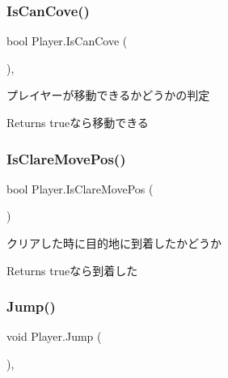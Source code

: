 \subsubsection{\texorpdfstring{Is\+Can\+Cove()}{IsCanCove()}}
{\footnotesize\ttfamily bool Player.\+Is\+Can\+Cove (\begin{DoxyParamCaption}{ }\end{DoxyParamCaption})\hspace{0.3cm}{\ttfamily [inline]}, {\ttfamily [private]}}



プレイヤーが移動できるかどうかの判定 

\begin{DoxyReturn}{Returns}
trueなら移動できる
\end{DoxyReturn}
\mbox{\label{class_player_a2aacc7413713cf79b529a0a9965ea3d8}} 
\subsubsection{\texorpdfstring{Is\+Clare\+Move\+Pos()}{IsClareMovePos()}}
{\footnotesize\ttfamily bool Player.\+Is\+Clare\+Move\+Pos (\begin{DoxyParamCaption}{ }\end{DoxyParamCaption})\hspace{0.3cm}{\ttfamily [inline]}}



クリアした時に目的地に到着したかどうか 

\begin{DoxyReturn}{Returns}
trueなら到着した
\end{DoxyReturn}
\mbox{\label{class_player_a689d6b007b09f694a246fe806bef7d5f}} 
\subsubsection{\texorpdfstring{Jump()}{Jump()}}
{\footnotesize\ttfamily void Player.\+Jump (\begin{DoxyParamCaption}{ }\end{DoxyParamCaption})\hspace{0.3cm}{\ttfamily [inline]}, {\ttfamily [private]}}



